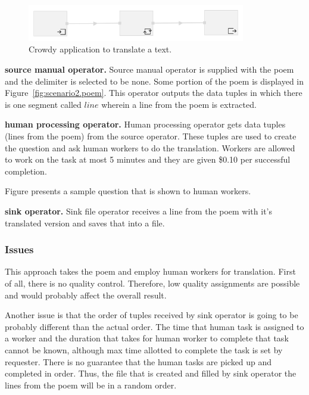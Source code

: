 \begin{figure}[ht]
	\centering
	\includegraphics[width=0.85\textwidth]{figures/scenarios/naive.png}
	\caption{Crowdy application to translate a text.}
	\label{fig:scenario2}
\end{figure}

\textbf{source manual operator.}
Source manual operator is supplied with the poem and the delimiter is selected to be none. Some portion of the poem is displayed in Figure~\ref{fig:scenario2.poem}. This operator outputs the data tuples in which there is one segment called $line$ wherein a line from the poem is extracted.


\textbf{human processing operator.}
Human processing operator gets data tuples (lines from the poem) from the source operator. These tuples are used to create the question and ask human workers to do the translation. Workers are allowed to work on the task at most 5 minutes and they are given \$0.10 per successful completion.

Figure presents a sample question that is shown to human workers.


\textbf{sink operator.}
Sink file operator receives a line from the poem with it's translated version and saves that into a file.


\subsubsection{Issues}
This approach takes the poem and employ human workers for translation. First of all, there is no quality control. Therefore, low quality assignments are possible and would probably affect the overall result.

Another issue is that the order of tuples received by sink operator is going to be probably different than the actual order. The time that human task is assigned to a worker and the duration that takes for human worker to complete that task cannot be known, although max time allotted to complete the task is set by requester. There is no guarantee that the human tasks are picked up and completed in order. Thus, the file that is created and filled by sink operator the lines from the poem will be in a random order.

